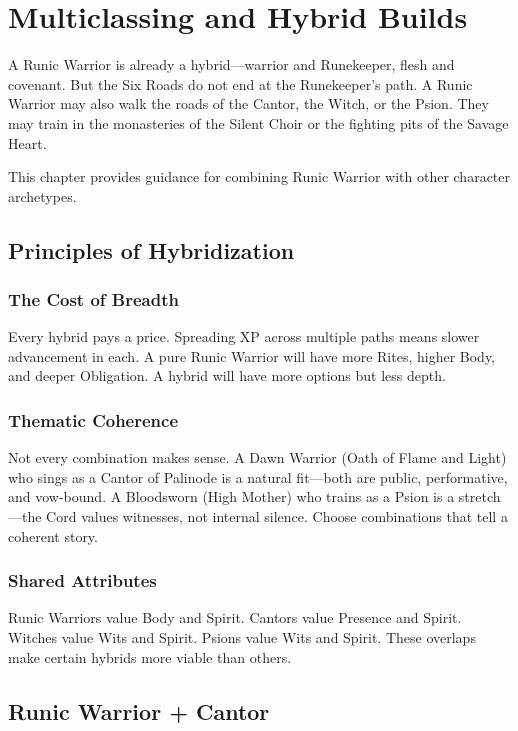 \section{Multiclassing and Hybrid Builds}

A Runic Warrior is already a hybrid—warrior and Runekeeper, flesh and covenant. But the Six Roads do not end at the Runekeeper's path. A Runic Warrior may also walk the roads of the Cantor, the Witch, or the Psion. They may train in the monasteries of the Silent Choir or the fighting pits of the Savage Heart.

This chapter provides guidance for combining Runic Warrior with other character archetypes.

\subsection{Principles of Hybridization}

\subsubsection{The Cost of Breadth}

Every hybrid pays a price. Spreading XP across multiple paths means slower advancement in each. A pure Runic Warrior will have more Rites, higher Body, and deeper Obligation. A hybrid will have more options but less depth.

\subsubsection{Thematic Coherence}

Not every combination makes sense. A Dawn Warrior (Oath of Flame and Light) who sings as a Cantor of Palinode is a natural fit—both are public, performative, and vow-bound. A Bloodsworn (High Mother) who trains as a Psion is a stretch—the Cord values witnesses, not internal silence. Choose combinations that tell a coherent story.

\subsubsection{Shared Attributes}

Runic Warriors value Body and Spirit. Cantors value Presence and Spirit. Witches value Wits and Spirit. Psions value Wits and Spirit. These overlaps make certain hybrids more viable than others.

\subsection{Runic Warrior + Cantor}

